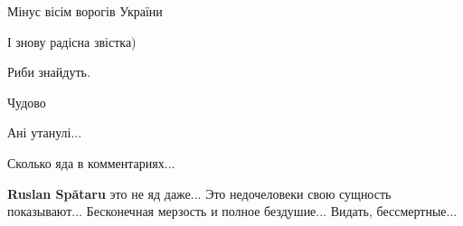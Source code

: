 \begin{itemize}
Мінус вісім ворогів України

 
І знову радісна звістка)

 
Риби знайдуть.

 
Чудово

 
Ані утанулі...

 
Сколько яда в комментариях... 🤦🤦🤦

\begin{itemize}
 
\textbf{Ruslan Spătaru} это не яд даже... Это недочеловеки свою сущность
показывают... Бесконечная мерзость и полное бездушие... Видать, бессмертные...

 

\end{itemize}
\end{itemize}
